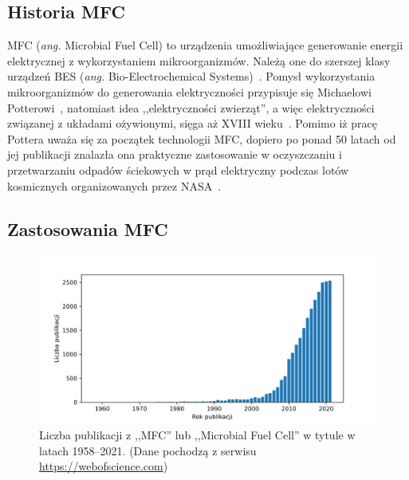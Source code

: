 \subsection{Historia MFC}\label{subsec:historia}
MFC (\textit{ang.} Microbial Fuel Cell) to urządzenia umożliwiające
generowanie energii elektrycznej z wykorzystaniem mikroorganizmów.
Należą one do szerszej klasy urządzeń BES (\textit{ang.}
Bio-Electrochemical Systems)~\cite{Santoro2017}.
Pomysł wykorzystania mikroorganizmów do generowania elektryczności
przypisuje się Michaelowi Potterowi~\cite{Potter1911},
natomiast idea ,,elektryczności zwierząt'', a więc elektryczności
związanej z układami ożywionymi, sięga aż XVIII wieku~\cite{Santoro2017}.
Pomimo iż pracę Pottera uważa się za początek technologii MFC,
dopiero po ponad 50 latach od jej publikacji
znalazła ona praktyczne zastosowanie w oczyszczaniu i przetwarzaniu
odpadów ściekowych w prąd elektryczny podczas lotów kosmicznych
organizowanych przez NASA~\cite{Slate2019}.

\subsection{Zastosowania MFC}\label{subsec:zastosowania-mfc}

\begin{figure}[!b]
    \centering
    \includegraphics[width=12cm]{figures/publications}
    \caption{
        Liczba publikacji z ,,MFC'' lub
        ,,Microbial Fuel Cell'' w tytule w latach 1958--2021.
        (Dane pochodzą z serwisu \url{https://webofscience.com})
    }
    \label{fig:1}
\end{figure}

